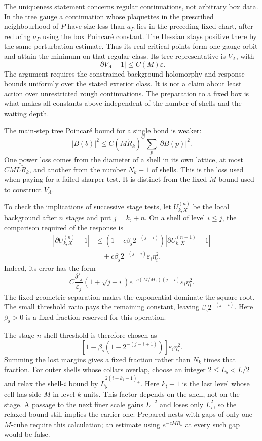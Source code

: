 \documentclass[11pt,letterpaper,reqno]{amsart}
\theoremstyle{definition}
\theoremstyle{remark}
\begin{document}
The uniqueness statement concerns regular
continuations, not arbitrary box data. In the
tree gauge a continuation whose plaquettes in
the prescribed neighbourhood of \(P\) have size
less than \(a_P\) lies in the preceding fixed
chart, after reducing \(a_P\) using the box
Poincar\'e constant. The Hessian stays positive
there by the same perturbation estimate.
Thus its real critical points form one gauge
orbit and attain the minimum on that regular
class. Its tree representative is \(V_\Lambda\),
with
\[
 |\partial V_\Lambda-1|\le C(M)\varepsilon .
\]
The argument requires the constrained-background
holomorphy and response bounds uniformly over
the stated exterior class. It is not a claim
about least action over unrestricted rough
continuations. The preparation to a fixed
box is what makes all constants above independent
of the number of shells and the waiting depth.

The main-step tree Poincar\'e bound
for a single bond is weaker:
\[
 |B(b)|^2\le C(M\check R_k)^C
                         \sum_p|\partial B(p)|^2.
\]
One power loss comes from the
diameter of a shell in its own
lattice, at most $CML\check R_k$,
and another from the number
$N_k+1$ of shells. This is the
loss used when paying for a failed
sharper test. It is distinct from
the fixed-$M$ bound used to
construct $V_\Lambda$.

To check the implications of
successive stage tests, let
$U^{(n)}_{k,X}$ be the local
background after $n$ stages and
put $j=k_\flat+n$. On a shell
of level $i\le j$, the comparison
required of the response is
\begin{equation}\label{eq:xrg-stage-curvature}
 \begin{split}
 |\partial U^{(n)}_{k,X}-1|
 &\le(1+c\beta_{\mathrm s}2^{-(j-i)})
             |\partial U^{(n+1)}_{k,X}-1|\\
 &\quad+c\beta_{\mathrm s}2^{-(j-i)}
                                     \varepsilon_i\eta_i^2.
 \end{split}
\end{equation}
Indeed, its error has the form
\[
 C\frac{\delta'_j}{\varepsilon_j}
     (1+\sqrt{j-i})e^{-c(M/M_1)(j-i)}
                                  \varepsilon_i\eta_i^2.
\]
The fixed geometric separation makes
the exponential dominate the square
root. The small threshold ratio
pays the remaining constant, leaving
$\beta_{\mathrm s}2^{-(j-i)}$.
Here $\beta_{\mathrm s}>0$ is a
fixed fraction reserved for this
operation.

The stage-$n$ shell threshold is
therefore chosen as
\[
 [1-\beta_{\mathrm s}(1-2^{-(j-i+1)})]
                                  \varepsilon_i\eta_i^2.
\]
Summing the lost margins gives
a fixed fraction rather than
$N_k$ times that fraction.
For outer shells whose collars
overlap, choose an integer
$2\le L_\flat<L/2$ and relax
the shell-$i$ bound by
$L_\flat^{2(i-k_\sharp-1)_+}$.
Here $k_\sharp+1$ is the last
level whose cell has side $M$
in level-$k$ units.
This factor depends on the shell,
not on the stage. A passage to
the next finer scale gains
$L^{-2}$ and loses only
$L_\flat^2$, so the relaxed
bound still implies the earlier
one. Prepared nests with gaps
of only one $M$-cube require
this calculation; an estimate
using $e^{-cM\check R_k}$ at
every such gap would be false.
\end{document}
